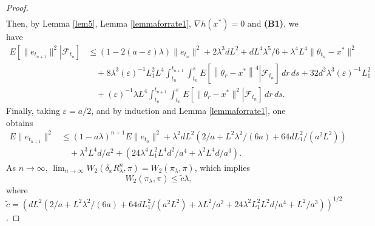 \documentclass[a4paper]{article}
\begin{document}
\begin{proof}
\begin{align*}
		\end{align*}
		Then, by  Lemma \ref{lem5}, Lemma \ref{lemmaforrate1}, $\nabla h(x^*)=0$ and {\bf (B1)}, we have
		\begin{align*}
		E\left[\left.\|e_{t_{n+1}}\|^2\right| \mathcal{F}_{t_n}\right]	&\leq (1-2(a-\varepsilon)\lambda) \|e_{t_n}\|^2 +2\lambda^3dL^2+dL^4\lambda^5/6+\lambda^4L^4\|\theta_{t_n}-x^*\|^2\\
		& \hspace{1em}  +8\lambda^3(\varepsilon)^{-1}L_1^2L^4\int_{t_n}^{t_{n+1}}\int_{t_n}^sE\left[\left.\left\|\theta_r-x^*\right\|^4\right| \mathcal{F}_{t_n}\right]\,dr \,ds+32d^2\lambda^3(\varepsilon)^{-1}L_1^2\\
		& \hspace{1em}  +(\varepsilon)^{-1}\lambda L^4\int_{t_n}^{t_{n+1}}\int_{t_n}^{s}E\left[\left.\|\theta_r- x^*\|^2\right| \mathcal{F}_{t_n}\right]\,dr  \,ds.
		\end{align*}
		Finally, taking $\varepsilon = a/2$, and by induction and Lemma \ref{lemmaforrate1}, one obtains
		\begin{align*}
		E\|e_{t_{n+1}}\|^2 	&\leq (1-a\lambda)^{n+1}E\|e_{t_0}\|^2 +\lambda^2dL^2\left(2/a+L^2\lambda^2/(6a)+64dL_1^2/(a^2L^2)\right)\\
		& \hspace{1em} +\lambda^3L^4d/a^2 + \left(24\lambda^4L_1^2L^4d^2/a^4+\lambda^2L^4d/a^3\right).
		\end{align*}
		As $n \rightarrow \infty$, $\lim_{n\rightarrow \infty}W_2(\delta_xR^n_{\lambda}, \pi) = W_2(\pi_{\lambda}, \pi)$, which implies
		\[
		W_2(\pi_{\lambda}, \pi) \leq \tilde{c}\lambda,
		\]
		where $
		\tilde{c} = \left(dL^2\left(2/a+L^2\lambda^2/(6a)+64dL_1^2/(a^2L^2)+\lambda L^2/a^2+24\lambda^2 L_1^2L^2d/a^4+ L^2/a^3\right)\right)^{1/2}$.
		\end{proof}
		
\end{document}
